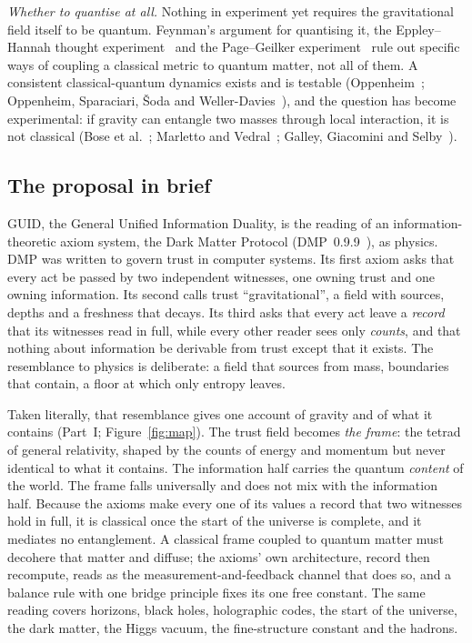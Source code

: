\documentclass[11pt,a4paper]{article}
\begin{document}
\emph{Whether to quantise at all.} Nothing in experiment yet requires the gravitational field itself to be quantum. Feynman's argument for
quantising it, the Eppley--Hannah thought experiment~\cite{eppley} and the Page--Geilker experiment~\cite{pagegeilker} rule out specific
ways of coupling a classical metric to quantum matter, not all of them. A consistent classical-quantum dynamics exists and is testable
(Oppenheim~\cite{oppenheim}; Oppenheim, Sparaciari, \v{S}oda and Weller-Davies~\cite{osswd}), and the question has become experimental:
if gravity can entangle two masses through local interaction, it is not classical (Bose et al.~\cite{bose}; Marletto and Vedral~\cite{mv};
Galley, Giacomini and Selby~\cite{ggs}).

\subsection{The proposal in brief}

GUID, the General Unified Information Duality, is the reading of an information-theoretic axiom system, the Dark Matter Protocol
(DMP~0.9.9~\cite{dmp}), as physics. DMP was written to govern trust in computer systems. Its first axiom asks that every act be passed by
two independent witnesses, one owning trust and one owning information. Its second calls trust ``gravitational'', a field with sources,
depths and a freshness that decays. Its third asks that every act leave a \emph{record} that its witnesses read in full, while every other
reader sees only \emph{counts}, and that nothing about information be derivable from trust except that it exists. The resemblance to
physics is deliberate: a field that sources from mass, boundaries that contain, a floor at which only entropy leaves.

Taken literally, that resemblance gives one account of gravity and of what it contains (Part~I; Figure~\ref{fig:map}). The trust field
becomes \emph{the frame}: the tetrad of general relativity, shaped by the counts of energy and momentum but never identical to what it
contains. The information half carries the quantum \emph{content} of the world. The frame falls universally and does not mix with the
information half. Because the axioms make every one of its values a record that two witnesses hold in full, it is classical once the
start of the universe is complete, and it mediates no entanglement. A classical frame coupled to quantum matter must decohere that matter
and diffuse; the axioms' own architecture, record then recompute, reads as the measurement-and-feedback channel that does so, and a balance
rule with one bridge principle fixes its one free constant. The same reading covers horizons, black holes, holographic codes, the start of the universe, the
dark matter, the Higgs vacuum, the fine-structure constant and the hadrons.
\end{document}

